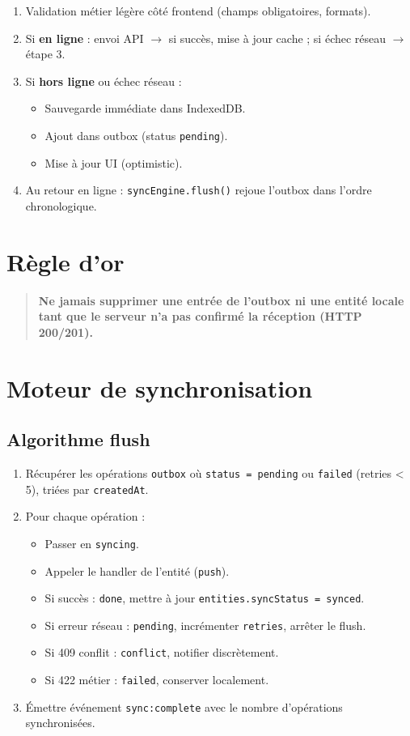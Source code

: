 \documentclass[12pt,a4paper]{report}
\begin{document}
\begin{enumerate}
  \item Validation métier légère côté frontend (champs obligatoires, formats).
  \item Si \textbf{en ligne} : envoi API $\rightarrow$ si succès, mise à jour cache ; si échec réseau $\rightarrow$ étape 3.
  \item Si \textbf{hors ligne} ou échec réseau :
    \begin{itemize}
      \item Sauvegarde immédiate dans IndexedDB.
      \item Ajout dans outbox (status \texttt{pending}).
      \item Mise à jour UI (optimistic).
    \end{itemize}
  \item Au retour en ligne : \texttt{syncEngine.flush()} rejoue l'outbox dans l'ordre chronologique.
\end{enumerate}

\section{Règle d'or}

\begin{quote}
\textbf{Ne jamais supprimer une entrée de l'outbox ni une entité locale tant que le serveur n'a pas confirmé la réception (HTTP 200/201).}
\end{quote}

\section{Moteur de synchronisation}

\subsection{Algorithme flush}

\begin{enumerate}
  \item Récupérer les opérations \texttt{outbox} où \texttt{status = pending} ou \texttt{failed} (retries < 5), triées par \texttt{createdAt}.
  \item Pour chaque opération :
    \begin{itemize}
      \item Passer en \texttt{syncing}.
      \item Appeler le handler de l'entité (\texttt{push}).
      \item Si succès : \texttt{done}, mettre à jour \texttt{entities.syncStatus = synced}.
      \item Si erreur réseau : \texttt{pending}, incrémenter \texttt{retries}, arrêter le flush.
      \item Si 409 conflit : \texttt{conflict}, notifier discrètement.
      \item Si 422 métier : \texttt{failed}, conserver localement.
    \end{itemize}
  \item Émettre événement \texttt{sync:complete} avec le nombre d'opérations synchronisées.
\end{enumerate}
\end{document}
